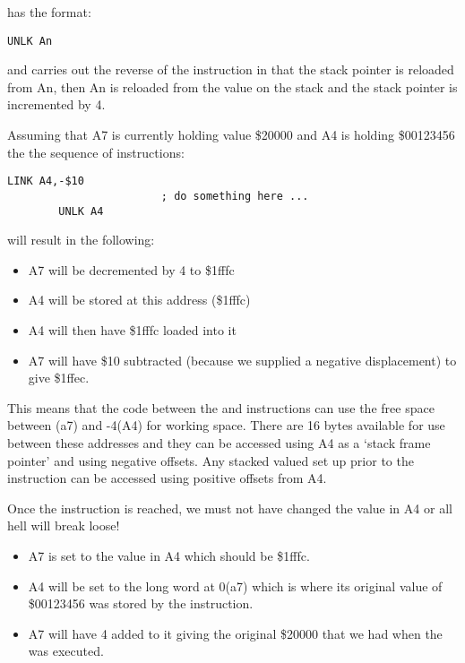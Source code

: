  has the format:

\begin{lstlisting}[firstnumber=1,]
        UNLK An
\end{lstlisting}

and carries out the reverse of the  instruction in that the
      stack pointer is reloaded from An, then An is reloaded from the value on
      the stack and the stack pointer is incremented by 4.

Assuming that A7 is currently holding value \$20000 and A4 is
      holding \$00123456 the the sequence of instructions:

\begin{lstlisting}[firstnumber=1,]
        LINK A4,-$10
                        ; do something here ...
        UNLK A4
\end{lstlisting}

will result in the following:
\begin{itemize}[itemsep=0pt]

\item{}A7 will be decremented by 4 to \$1fffc


\item{}A4 will be stored at this address (\$1fffc)


\item{}A4 will then have \$1fffc loaded into it


\item{}A7 will have \$10 subtracted (because we supplied a negative
          displacement) to give \$1ffec.

\end{itemize}

This means that the code between the  and  instructions
      can use the free space between (a7) and -{}4(A4) for working space. There
      are 16 bytes available for use between these addresses and they can be
      accessed using A4 as a `stack frame pointer' and using negative
      offsets. Any stacked valued set up prior to the  instruction can be accessed using positive offsets from A4.

Once the  instruction is reached, we must not have changed the
      value in A4 or all hell will break loose!
\begin{itemize}[itemsep=0pt]

\item{}A7 is set to the value in A4 which should be \$1fffc.


\item{}A4 will be set to the long word at 0(a7) which is where its
          original value of \$00123456 was stored by the 
          instruction.


\item{}A7 will have 4 added to it giving the original \$20000 that we
          had when the  was executed.

\end{itemize}

